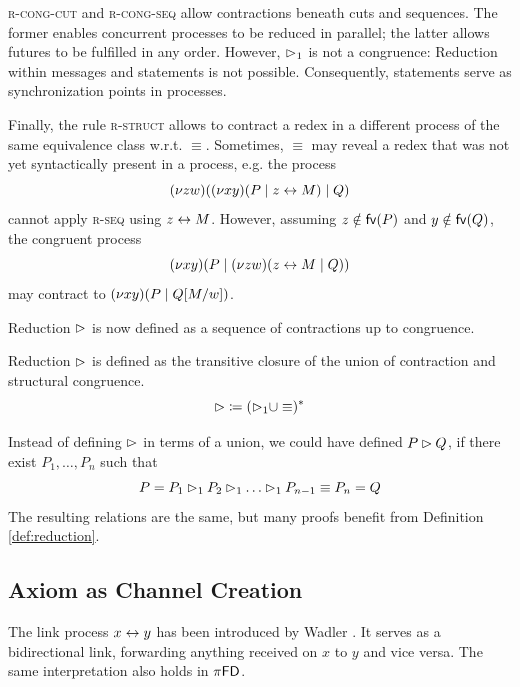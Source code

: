 \textsc{r-cong-cut} and \textsc{r-cong-seq} allow contractions beneath cuts and
sequences. The former enables concurrent processes to be reduced in parallel;
the latter allows futures to be fulfilled in any order. However, $\rhd_1$ is
not a congruence: Reduction within messages and statements is not possible.
Consequently, statements serve as synchronization points in processes.

Finally, the rule \textsc{r-struct} allows to contract a redex in a different
process of the same equivalence class w.r.t. $\equiv$. Sometimes,
$\equiv$ may reveal a redex that was not yet syntactically present in a process, e.g.
the process
\[
    (\nu z w)((\nu x y)(P \mid z \leftrightarrow M) \mid Q)
\]
cannot apply \textsc{r-seq} using $z \leftrightarrow M$. However, assuming
$z \notin \mathsf{fv}(P)$ and $y \notin \mathsf{fv}(Q)$, the congruent process
\[
    (\nu x y)(P \mid (\nu z w)(z \leftrightarrow M \mid Q))
\]
may contract to $(\nu x y)(P \mid Q[M/w])$.

Reduction $\rhd$ is now defined as a sequence of contractions up to congruence.

\begin{definition}[Reduction] \label{def:reduction}
  Reduction $\rhd$ is defined as the transitive closure of the union
  of contraction and structural congruence.
  \begin{equation*}
    \rhd \coloneq (\rhd_1 \cup \equiv)^*
  \end{equation*}
\end{definition}

\begin{remark}
  Instead of defining $\rhd$ in terms of a union, we could have defined
  $P \rhd Q$, if there exist $P_1, \hdots, P_n$ such that
  \[
    P = P_1 \rhd_1 P_2 \rhd_1 \hdots \rhd_1 P_{n-1} \equiv P_n = Q
  \]
  The resulting relations are the same, but many proofs benefit from Definition \ref{def:reduction}.
\end{remark}

\subsection{Axiom as Channel Creation}
The link process $x \leftrightarrow y$ has been introduced by Wadler \cite{Wadler2012:PropositionsAsSessions}.
It serves as a bidirectional link, forwarding anything received on $x$ to $y$
and vice versa. The same interpretation also holds in $\pi\textsf{FD}$.

